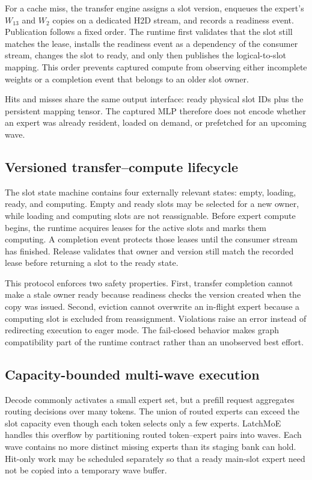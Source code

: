 For a cache miss, the transfer engine assigns a slot version, enqueues the
expert's $W_{13}$ and $W_2$ copies on a dedicated H2D stream, and records a
readiness event. Publication follows a fixed order. The runtime first validates
that the slot still matches the lease, installs the readiness event as a
dependency of the consumer stream, changes the slot to ready, and only then
publishes the logical-to-slot mapping. This order prevents captured compute
from observing either incomplete weights or a completion event that belongs to
an older slot owner.

Hits and misses share the same output interface: ready physical slot IDs plus
the persistent mapping tensor. The captured MLP therefore does not encode
whether an expert was already resident, loaded on demand, or prefetched for an
upcoming wave.

\subsection{Versioned transfer--compute lifecycle}
\label{sec:lifecycle}

The slot state machine contains four externally relevant states: empty,
loading, ready, and computing. Empty and ready slots may be selected for a new
owner, while loading and computing slots are not reassignable. Before expert
compute begins, the runtime acquires leases for the active slots and marks
them computing. A completion event protects those leases until the consumer
stream has finished. Release validates that owner and version still match the
recorded lease before returning a slot to the ready state.

This protocol enforces two safety properties. First, transfer completion cannot
make a stale owner ready because readiness checks the version created when the
copy was issued. Second, eviction cannot overwrite an in-flight expert because
a computing slot is excluded from reassignment. Violations raise an error
instead of redirecting execution to eager mode. The fail-closed behavior makes
graph compatibility part of the runtime contract rather than an unobserved
best effort.

\subsection{Capacity-bounded multi-wave execution}
\label{sec:waves}

Decode commonly activates a small expert set, but a prefill request aggregates
routing decisions over many tokens. The union of routed experts can exceed the
slot capacity even though each token selects only a few experts. LatchMoE
handles this overflow by partitioning routed token--expert pairs into waves.
Each wave contains no more distinct missing experts than its staging bank can
hold. Hit-only work may be scheduled separately so that a ready main-slot
expert need not be copied into a temporary wave buffer.

